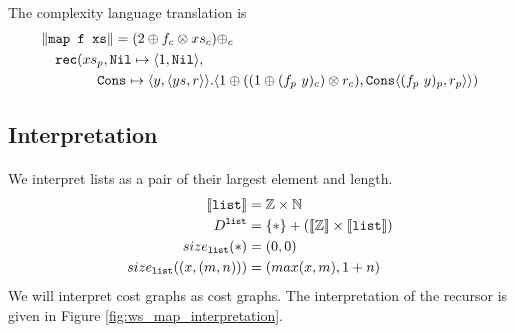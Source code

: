 %
The complexity language translation is
%
\begin{equation*}
\begin{split}
    &\|\texttt{map f xs}\| = (2 \oplus f_c \otimes xs_c) \oplus_c \\
    &\quad \texttt{rec}(xs_p, \texttt{Nil}\mapsto \langle 1, \texttt{Nil}\rangle, \\
    &\qquad\quad\quad \texttt{Cons} \mapsto \langle y, \langle ys, r \rangle \rangle. \langle 1 \oplus ((1 \oplus (f_p\ y)_c) \otimes r_c), \texttt{Cons} \langle (f_p\ y)_p, r_p \rangle \rangle)
\end{split}
\end{equation*}
%
\subsection{Interpretation}
\paragraph{}
We interpret lists as a pair of their largest element and length.
%
\begin{align*}
  \llbracket \texttt{list} \rrbracket &= \mathbb{Z} \times \mathbb{N} \\
  D^{\texttt{list}} &= \{*\} + (\llbracket \mathbb{Z} \rrbracket \times \llbracket \texttt{list} \rrbracket) \\
  size_{\texttt{list}}(*) &= (0, 0) \\
  size_{\texttt{list}}((x, (m, n))) &= (max(x, m), 1 + n)
\end{align*}
%
We will interpret cost graphs as cost graphs.
The interpretation of the recursor is given in Figure \ref{fig:ws_map_interpretation}.
%
